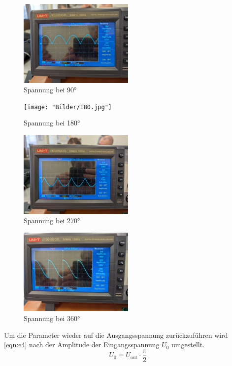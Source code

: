 \begin{figure}
    \caption{Spannung bei 90$\unit{\degree}$}
    \label{fig:12}
    \centering
    \includegraphics[width=0.5\textwidth]{"Bilder/90.jpg"}
\end{figure}
\begin{figure}
    \caption{Spannung bei 180$\unit{\degree}$}
    \label{fig:12}
    \centering
    \texttt{[image: "Bilder/180.jpg"]}
\end{figure}
\begin{figure}
    \caption{Spannung bei 270$\unit{\degree}$}
    \label{fig:12}
    \centering
    \includegraphics[width=0.5\textwidth]{"Bilder/270.jpg"}
\end{figure}
\begin{figure}
    \caption{Spannung bei 360$\unit{\degree}$}
    \label{fig:12}
    \centering
    \includegraphics[width=0.5\textwidth]{"Bilder/360.jpg"}
\end{figure}

Um die Parameter wieder auf die Ausgangsspannung zurückzuführen wird \autoref{eqn:e4} nach der 
Amplitude der Eingangsspannung $U_0$ umgestellt.
\begin{equation}
    U_0 = U_{\text{out}} \cdot \frac{\pi}{2} 
\end{equation}







